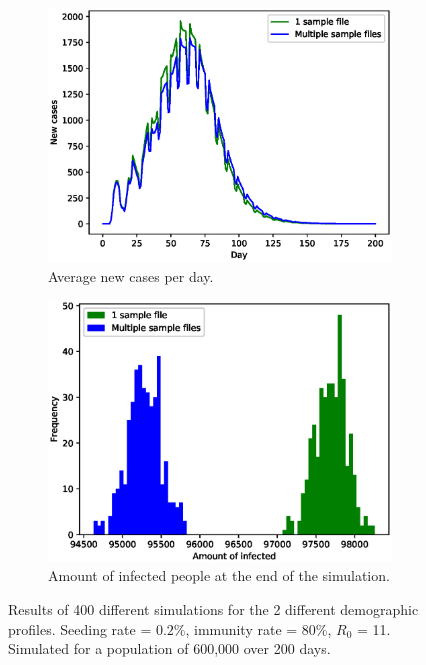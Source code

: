 \documentclass[runningheads]{llncs}
\begin{document}
\begin{figure}[h!]
	\centering
	\begin{subfigure}[b]{0.6\linewidth}
		\includegraphics[width=\linewidth]{Demographic/figs/plot_compSize_CASE_PER_DAY_AVG.eps}
		\caption{Average new cases per day.}
	\end{subfigure}
	\begin{subfigure}[b]{0.6\linewidth}
		\includegraphics[width=\linewidth]{Demographic/figs/plot_compSize_FINALDAY_HIST.eps}
		\caption{Amount of infected people at the end of the simulation.}
	\end{subfigure}
	\caption{Results of 400 different simulations for the 2 different demographic profiles. Seeding rate = $0.2\%$, immunity rate = $80\%$, $R_0$ = 11. Simulated for a population of 600,000 over 200 days.}
	\label{demographic_profile}
\end{figure}
\end{document}
